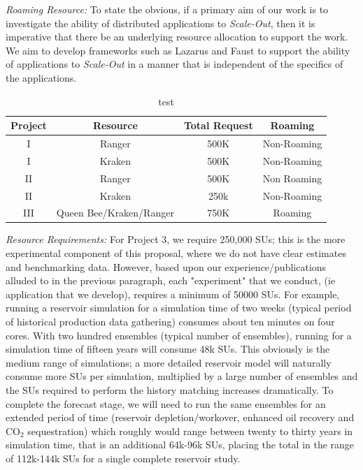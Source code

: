 \documentclass[a4paper,10pt]{article}
\begin{document}
{\it Roaming Resource:} To state the obvious, if a primary aim of our work is to investigate the ability of distributed applications to {\it Scale-Out}, then it is imperative that there be an underlying resource allocation to support the work. We aim to develop frameworks such as Lazarus and Faust to support the ability of applications to {\it Scale-Out} in a manner that is independent of the specifics of the applications.

\begin{table}[!h]
\begin{center}
  \caption{test \newline}
\label{table:systems}
\begin{tabular}{|c| c | c | c | }
\hline 
Project & Resource & Total Request & Roaming \\
\hline
I & Ranger  & 500K & Non-Roaming \\
I & Kraken & 500K  & Non-Roaming \\
II & Ranger & 500K & Non Roaming \\
II & Kraken & 250k & Non-Roaming \\
III & Queen Bee/Kraken/Ranger & 750K & Roaming \\
\hline
\end{tabular}
\end{center}
\end{table}


{\it Resource Requirements:} For Project 3, we require 250,000 SUs; this is the more experimental component of this proposal, where we do not have clear estimates and benchmarking data. However, based upon our experience/publications alluded to in the previous paragraph, each "experiment" that we conduct, (ie application that we develop), requires a minimum of 50000 SUs. For example, running a reservoir simulation for a simulation
time of two weeks (typical period of historical production data gathering) consumes about ten minutes on four cores. 
With two hundred ensembles (typical number of ensembles), running for a simulation time of fifteen years will consume
48k SUs. This obviously is the medium range of simulations; a more detailed reservoir model
will naturally consume more SUs per simulation, multiplied by a large number of ensembles and the SUs required
to perform the history matching increases dramatically. To complete the forecast stage, we will need to run
the same ensembles for an extended period of time (reservoir depletion/workover, enhanced oil recovery and
CO$_2$ sequestration) which roughly would range between twenty to thirty years in simulation time, that is
an additional 64k-96k SUs, placing the total in the range of 112k-144k SUs for a single complete reservoir study.
\end{document}
